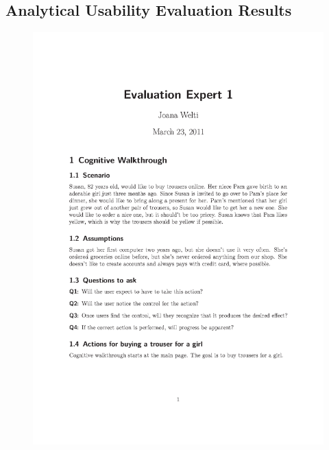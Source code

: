 \subsection{Analytical Usability Evaluation Results}
\begin{figure}[H]
\begin{center}
\includegraphics[scale=0.77]{Analytical_Usability_Evaluation/cognitive_walkthrough_joana_1.png}
\end{center}
\end{figure}
\newpage


